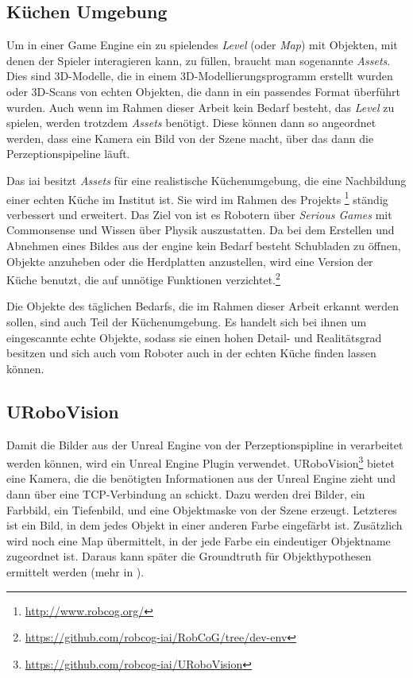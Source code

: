 \subsection{Küchen Umgebung}
\label{subsec:kitchenenvironment}
Um in einer Game Engine ein zu spielendes \textit{Level} (oder \textit{Map}) mit Objekten, mit denen der Spieler interagieren kann, zu füllen, braucht man sogenannte \textit{Assets}. Dies sind 3D-Modelle, die in einem 3D-Modellierungsprogramm erstellt wurden oder 3D-Scans von echten Objekten, die dann in ein passendes Format überführt wurden. Auch wenn im Rahmen dieser Arbeit kein Bedarf besteht, das \textit{Level} zu spielen, werden trotzdem \textit{Assets} benötigt. Diese können dann so angeordnet werden, dass eine Kamera ein Bild von der Szene macht, über das dann die Perzeptionspipeline läuft. \par
Das \gls{iai} besitzt \textit{Assets} für eine realistische Küchenumgebung, die eine Nachbildung einer echten Küche im Institut ist. Sie wird im Rahmen des Projekts \robcog\footnote{\url{http://www.robcog.org/}} ständig verbessert und erweitert. Das Ziel von \robcog ist es Robotern über \textit{Serious Games} mit Commonsense und Wissen über Physik auszustatten. Da bei dem Erstellen und Abnehmen eines Bildes aus der \acrshort{engine} kein Bedarf besteht Schubladen zu öffnen, Objekte anzuheben oder die Herdplatten anzustellen, wird eine Version der Küche benutzt, die auf unnötige Funktionen verzichtet.\footnote{\url{https://github.com/robcog-iai/RobCoG/tree/dev-env}} \par
Die Objekte des täglichen Bedarfs, die im Rahmen dieser Arbeit erkannt werden sollen, sind auch Teil der Küchenumgebung. Es handelt sich bei ihnen um eingescannte echte Objekte, sodass sie einen hohen Detail- und Realitätsgrad besitzen und sich auch vom Roboter auch in der echten Küche finden lassen können.
 
\subsection{URoboVision}
\label{subsec:urobovision}
Damit die Bilder aus der Unreal Engine von der Perzeptionspipline in \robosherlock verarbeitet werden können, wird ein Unreal Engine Plugin verwendet. URoboVision\footnote{\url{https://github.com/robcog-iai/URoboVision}} bietet eine Kamera, die die benötigten Informationen aus der Unreal Engine zieht und dann über eine TCP-Verbindung an \robosherlock schickt. Dazu werden drei Bilder, ein Farbbild, ein Tiefenbild, und eine Objektmaske von der Szene erzeugt. Letzteres ist ein Bild, in dem jedes Objekt in einer anderen Farbe eingefärbt ist. Zusätzlich wird noch eine Map übermittelt, in der jede Farbe ein eindeutiger Objektname zugeordnet ist. Daraus kann später die Groundtruth für Objekthypothesen  ermittelt werden (mehr in ).   

